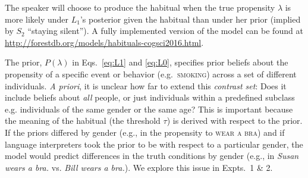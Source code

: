 \documentclass[10pt,letterpaper]{article}
\newcommand{\ndg}[1]{\textcolor{Green}{[ndg: #1]}}
\begin{document}
The speaker will choose to produce the habitual when the true propensity $\lambda$ is more likely under $L_1$'s posterior given the habitual than under her prior (implied by $S_2$ ``staying silent''). 
A fully implemented version of the model can be found at \url{http://forestdb.org/models/habituals-cogsci2016.html}.

The prior, $P(\lambda)$ in Eqs.~\ref{eq:L1} and \ref{eq:L0}, specifies prior beliefs about the propensity of a specific event or behavior (e.g.~\textsc{smoking}) across a set of different individuals.
\emph{A priori}, it is unclear how far to extend this \emph{contrast set}: Does it include beliefs about \emph{all} people, or just individuals within a predefined subclass e.g. individuals of the same gender or the same age? 
This is important because the meaning of the habitual (the threshold $\tau$) is derived with respect to the prior. 
If the priors differed by gender (e.g., in the propensity to \textsc{wear a bra}) and if language interpreters took the prior to be with respect to a particular gender, the model would predict differences in the truth conditions by gender (e.g., in \emph{Susan wears a bra.} vs. \emph{Bill wears a bra.}). 
We explore this issue in Expts.~1 \& 2.
%
%


\end{document}
